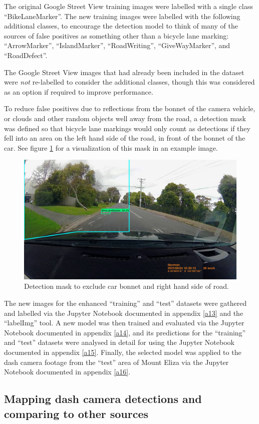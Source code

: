 \documentclass[11pt,twoside]{report}
\begin{document}
The original Google Street View training images were labelled with a single class ``BikeLaneMarker''.  The new training images were labelled with the following additional classes, to encourage the detection model to think of many of the sources of false positives as something other than a bicycle lane marking: ``ArrowMarker'', ``IslandMarker'', ``RoadWriting'', ``GiveWayMarker'', and ``RoadDefect''.

The Google Street View images that had already been included in the dataset were \textit{not} re-labelled to consider the additional classes, though this was considered as an option if required to improve performance.

To reduce false positives due to reflections from the bonnet of the camera vehicle, or clouds and other random objects well away from the road, a detection mask was defined so that bicycle lane markings would only count as detections if they fell into an area on the left hand side of the road, in front of the bonnet of the car.  See figure \ref{fig:006} for a visualization of this mask in an example image.

\begin{figure}[h!]
\centering
\includegraphics[width=0.5\linewidth]{f006_mask.jpg}
\caption{Detection mask to exclude car bonnet and right hand side of road.}
\label{fig:006}
\end{figure}

The new images for the enhanced ``training'' and ``test'' datasets were gathered and labelled via the Jupyter Notebook documented in appendix \ref{a13} and the ``labelImg'' tool.  A new model was then trained and evaluated via the Jupyter Notebook documented in appendix \ref{a14}, and its predictions for the ``training'' and ``test'' datasets were analysed in detail for using the Jupyter Notebook documented in appendix \ref{a15}.  Finally, the selected model was applied to the dash camera footage from the ``test'' area of Mount Eliza via the Jupyter Notebook documented in appendix \ref{a16}.


\subsection{Mapping dash camera detections and comparing to other sources}
\label{s:rq3d}
\end{document}
